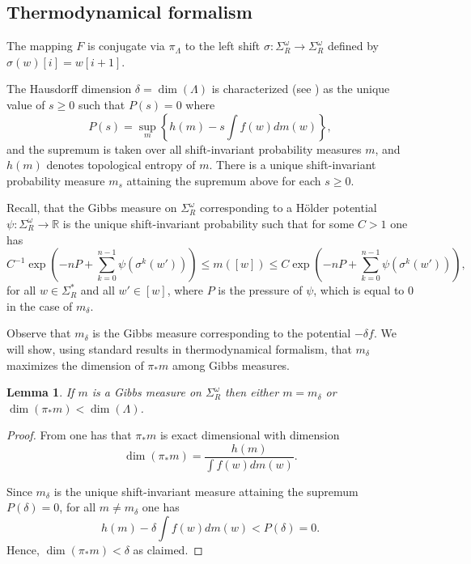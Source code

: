 \documentclass{article}
\newtheorem{lemma}{Lemma}
\newcommand{\R}{\mathbb{R}}
\begin{document}
\subsection{Thermodynamical formalism}

The mapping \(F\) is conjugate via \(\pi_\Lambda\) to the left shift \(\sigma:\Sigma^\omega_R \to \Sigma^\omega_R\) defined by \(\sigma(w)[i] = w[i+1]\).

The Hausdorff dimension \(\delta = \dim(\Lambda)\) is characterized (see \cite[Section 4]{bowen}) as the unique value of \(s \ge 0\) such that \(P(s) = 0\) where
\[P(s) = \sup\limits_{m} \left\lbrace h(m) - s\int f(w)dm(w)\right\rbrace,\]
and the supremum is taken over all shift-invariant probability measures \(m\), and \(h(m)\) denotes topological entropy of \(m\).  There is a unique shift-invariant probability measure \(m_s\) attaining the supremum above for each $s\geq 0$.

Recall, that the Gibbs measure on \(\Sigma^\omega_R\) corresponding to a Hölder potential \(\psi:\Sigma^\omega_R \to \R\) is the unique shift-invariant probability such that for some \(C > 1\) one has
\[C^{-1}\exp\left(-nP + \sum\limits_{k = 0}^{n-1}\psi(\sigma^k(w'))\right) \le m([w]) \le C\exp\left(-nP + \sum\limits_{k = 0}^{n-1}\psi(\sigma^k(w'))\right),\]
for all \(w \in \Sigma^*_R\) and all \(w' \in [w]\), where \(P\) is the pressure of \(\psi\), which is equal to \(0\) in the case of \(m_\delta\).

Observe that \(m_\delta\) is the Gibbs measure corresponding to the potential \(-\delta f\).  We will show, using standard results in thermodynamical formalism, that \(m_\delta\) maximizes the dimension of \(\pi_*m\) among Gibbs measures.

\begin{lemma}\label{ergodicdimlemma}
If \(m\) is a Gibbs measure on \(\Sigma^\omega_R\) then either \(m = m_\delta\) or \(\dim(\pi_*m) < \dim(\Lambda)\).
\end{lemma}
\begin{proof}
   From \cite[Theorem 8.1.4]{urbanksi} one has that \(\pi_*m\) is exact dimensional with dimension
   \[\dim(\pi_*m) = \frac{h(m)}{\int f(w)dm(w)}.\]

   Since \(m_\delta\) is the unique shift-invariant measure attaining the supremum \(P(\delta) = 0\), for all \(m \neq m_\delta\) one has
   \[h(m) - \delta \int f(w) dm(w) < P(\delta) = 0.\]
   Hence, \(\dim(\pi_*m) < \delta\) as claimed.
\end{proof}
\end{document}
